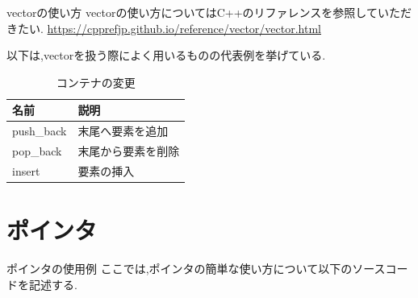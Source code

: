 \begin{frame}{vectorの使い方}
    vectorの使い方についてはC++のリファレンスを参照していただきたい.
    \url{https://cpprefjp.github.io/reference/vector/vector.html}
    
    以下は,vectorを扱う際によく用いるものの代表例を挙げている.
    \begin{table}[h]
        \centering
        \begin{tabular}{|l|l|}
            \hline
            名前 & 説明\\
            \hline
            push\_back & 末尾へ要素を追加\\
            pop\_back & 末尾から要素を削除\\
            insert & 要素の挿入\\
            \hline
        \end{tabular}
        \caption{コンテナの変更}
        \label{tab:my_label}
    \end{table}
\end{frame}

\section{ポインタ}
\begin{frame}[fragile]{ポインタの使用例}
    ここでは,ポインタの簡単な使い方について以下のソースコードを記述する.
    
\end{frame}

